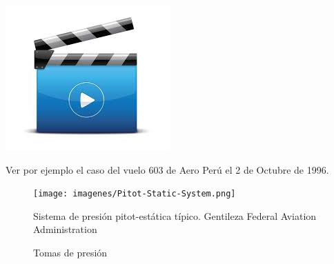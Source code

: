 \documentclass[a4paper,12pt,twoside]{article}
\begin{document}
\begin{minipage}[m]{0.15\textwidth}
\href{https://www.youtube.com/watch?v=U8YaBYO9oj0}{\includegraphics[width=\linewidth]{imagenes/iconos/video.jpg}}
\end{minipage}
\begin{minipage}[m]{0.80\textwidth}
  Ver por ejemplo el caso del vuelo 603 de Aero Perú el 2 de Octubre
  de 1996.
\end{minipage}


\begin{figure}[!h]
  \centering
  \texttt{[image: imagenes/Pitot-Static-System.png]}
    \caption{Sistema de presi\'on  pitot-est\'atica t\'ipico. Gentileza Federal Aviation Administration}
\label{fig:sistema.pitot.estatica}
\end{figure}

\begin{figure}[!h]
  \centering
  \caption{Tomas de presi\'on}
  \label{fig:tomas.presion}
\end{figure}
\end{document}
